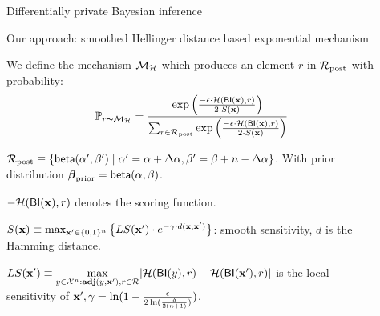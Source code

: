 \documentclass[final,hyperref={pdfpagelabels=false}]{beamer}
\begin{document}
\begin{frame}[t]
\begin{columns}[t]
\begin{column}{.485\textwidth}
\begin{block}{Differentially private Bayesian inference}
\end{block}



\begin{block}{Our approach: smoothed Hellinger distance based exponential mechanism}

We define the mechanism $\mathcal{M}_{\mathcal{H}}$ which produces an element $r$ in $\mathcal{R}_{\textup{post}}$ with probability:
\[
\mathbb{P}_{r \thicksim \mathcal{M}_{\mathcal{H}}} =
\frac 
{\exp \Big(\frac{-\epsilon\cdot\mathcal{H}(\mathsf{BI}(\textbf{x}),r)}{2\cdot S(\textbf{x})}\Big)}
{\sum_{r\in\mathcal{R}_{\textup{post}}} \exp \Big(\frac{-\epsilon\cdot\mathcal{H}(\mathsf{BI}(\textbf{x}),r)}{2\cdot S(\textbf{x})}\Big)}
\]
\begin{itemize}
 \small{ \item  $\mathcal{R}_{\textup{post}}\equiv\{\mathsf{beta}(\alpha',\beta')\mid \alpha'=\alpha+\Delta\alpha, \beta'=\beta+n-\Delta\alpha\}$. With prior distribution $\boldsymbol{\beta}_{\textup{prior}}=\mathsf{beta}(\alpha, \beta)$.}
  \item \small{$-\mathcal{H}(\mathsf{BI}(\textbf{x}),r)$ denotes the scoring function.}

  \item \small{$S(\textbf{x})\equiv \max_{\textbf{x}' \in \{0,1\}^{n}}\big\{ LS(\textbf{x}') \cdot e^{-\gamma\cdot d(\textbf{x},\textbf{x}')}\big\}$: smooth sensitivity\cite{nissim2007smooth}}, $d$ is the
    Hamming distance.
   \item \small{$LS(\textbf{x}')\equiv\max\limits_{y\in \mathcal{X}^n:\textbf{adj}(y,\textbf{x}'), r\in \mathcal{R}}\lvert \mathcal{H}(\mathsf{BI}(y), r) - \mathcal{H}(\mathsf{BI}(\textbf{x}'), r)\rvert$ is the local sensitivity of $\textbf{x}',\gamma =   \ln(1 - \frac{\epsilon}{2 \ln (\frac{\delta}{2 (n + 1)})})$}.
 \end{itemize}


\end{block}


\end{column} %

\begin{column}{.01\textwidth}\end{column} %
 
\begin{column}{.485\textwidth} %







\end{column}
\end{columns}
\end{frame}
\end{document}
